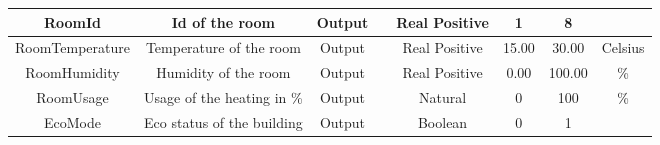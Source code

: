 \begin{center}
{\begin{tabular}{|| c | c | c | c| c | c | c | c ||}
				RoomId				& Id of the room 						& Output & 				&	Real Positive 						& 1					& 8		 	&   \\ 
				\hline
				RoomTemperature		& Temperature of the room				& Output & 				&	Real Positive 						& 15.00				& 30.00		& Celsius\degree \\ 
				\hline
				RoomHumidity		& Humidity of the room					& Output & 				&	Real Positive 						& 0.00				& 100.00	& \%	 \\ 
				\hline
				RoomUsage			& Usage of the heating in \%			& Output & 				&	Natural 							& 0					&	100 	&	\%	 \\ 
				\hline
				EcoMode				& Eco status of the building			& Output & 				&	Boolean								& 0					&	1 		&		  \\ 
				\hline
			\end{tabular}}
		\end{center}

